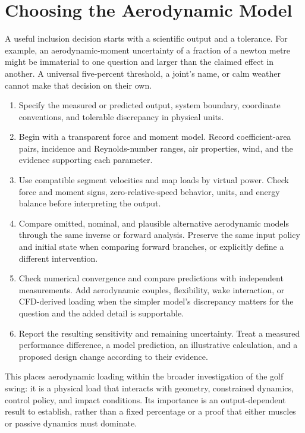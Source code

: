 \section{Choosing the Aerodynamic Model}

A useful inclusion decision starts with a scientific output and a tolerance.
For example, an aerodynamic-moment uncertainty of a fraction of a newton metre
might be immaterial to one question and larger than the claimed effect in
another. A universal five-percent threshold, a joint's name, or calm weather
cannot make that decision on their own.

\begin{enumerate}
\item Specify the measured or predicted output, system boundary, coordinate
      conventions, and tolerable discrepancy in physical units.
\item Begin with a transparent force and moment model. Record coefficient-area
      pairs, incidence and Reynolds-number ranges, air properties, wind, and
      the evidence supporting each parameter.
\item Use compatible segment velocities and map loads by virtual power. Check
      force and moment signs, zero-relative-speed behavior, units, and energy
      balance before interpreting the output.
\item Compare omitted, nominal, and plausible alternative aerodynamic models
      through the same inverse or forward analysis. Preserve the same input
      policy and initial state when comparing forward branches, or explicitly
      define a different intervention.
\item Check numerical convergence and compare predictions with independent
      measurements. Add aerodynamic couples, flexibility, wake interaction,
      or CFD-derived loading when the simpler model's discrepancy matters for
      the question and the added detail is supportable.
\item Report the resulting sensitivity and remaining uncertainty. Treat a
      measured performance difference, a model prediction, an illustrative
      calculation, and a proposed design change according to their evidence.
\end{enumerate}

This places aerodynamic loading within the broader investigation of the golf
swing: it is a physical load that interacts with geometry, constrained dynamics,
control policy, and impact conditions. Its importance is an output-dependent
result to establish, rather than a fixed percentage or a proof that either
muscles or passive dynamics must dominate.


